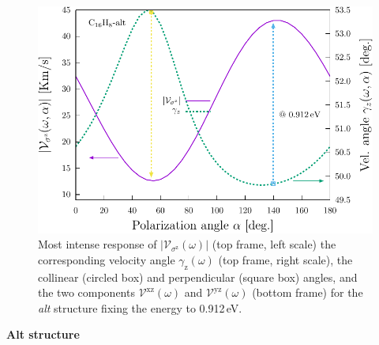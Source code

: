 \documentclass[prb,11pt,tightenlines,twocolumn,aps]{revtex4-1}
\begin{document}
\begin{figure}[t]
    \centering
    \includegraphics[width=\linewidth]{altplots/alt-vaz-rag}
    \caption{Most intense response of
    $|\mathcal{V}_{\sigma^{\mathrm{z}}}(\omega)|$ (top frame, left scale) the
    corresponding velocity angle $\gamma_{\mathrm{z}}(\omega)$ (top frame, right
    scale), the collinear (circled box) and perpendicular (square box) angles,
    and the two components $\mathcal{V}^{\mathrm{xz}}(\omega)$ and
    $\mathcal{V}^{\mathrm{yz}}(\omega)$ (bottom frame) for the \emph{alt}
    structure fixing the energy to 0.912\,eV.}
    \label{fig:alt-vaz-rag}
\end{figure}


\textbf{Alt structure}
\end{document}
